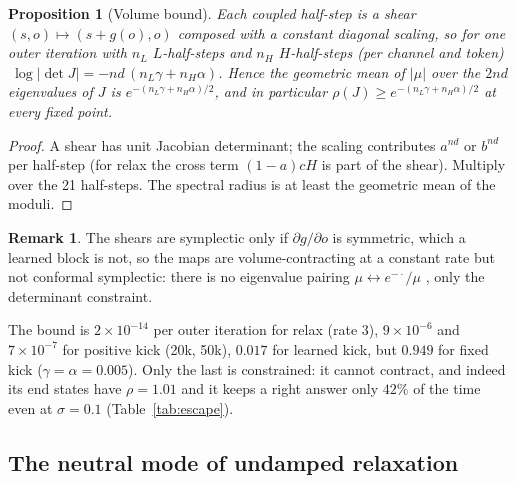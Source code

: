 \documentclass[11pt]{article}
\newtheorem{proposition}{Proposition}
\theoremstyle{definition}
\newtheorem{remark}{Remark}
\begin{document}
\begin{proposition}[Volume bound]\label{prop:volume}
Each coupled half-step is a shear $(s,o)\mapsto(s+g(o),o)$ composed with a constant diagonal scaling, so for one outer
iteration with $n_L$ $L$-half-steps and $n_H$ $H$-half-steps (per channel and token)
$\ \log|\det J| = -nd\,(n_L\gamma+n_H\alpha)$. Hence the geometric mean of $|\mu|$ over the $2nd$ eigenvalues of $J$ is
$e^{-(n_L\gamma+n_H\alpha)/2}$, and in particular $\rho(J)\ge e^{-(n_L\gamma+n_H\alpha)/2}$ at every fixed point.
\end{proposition}
\begin{proof}A shear has unit Jacobian determinant; the scaling contributes $a^{nd}$ or $b^{nd}$ per half-step (for relax the
cross term $(1-a)cH$ is part of the shear). Multiply over the 21 half-steps. The spectral radius is at least the geometric mean
of the moduli.\end{proof}

\begin{remark}The shears are symplectic only if $\partial g/\partial o$ is symmetric, which a learned block is not, so the maps are
volume-contracting at a constant rate but not conformal symplectic: there is no eigenvalue pairing $\mu\leftrightarrow e^{-\cdot}/\mu$
\cite{mclachlan2001conformal}, only the determinant constraint.\end{remark}

\noindent The bound is $2\times10^{-14}$ per outer iteration for relax (rate 3), $9\times10^{-6}$ and $7\times10^{-7}$ for positive kick
(20k, 50k), $0.017$ for learned kick, but $0.949$ for fixed kick ($\gamma=\alpha=0.005$). Only the last is constrained: it cannot contract,
and indeed its end states have $\rho=1.01$ and it keeps a right answer only $42\%$ of the time even at $\sigma=0.1$ (Table~\ref{tab:escape}).

\subsection{The neutral mode of undamped relaxation}
\end{document}
